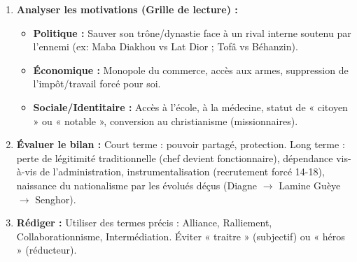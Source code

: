\documentclass[11pt]{article}
\newcommand{\cle}[1]{{\popxbold\color{popdark}#1}}
\begin{document}
\begin{methode}
\begin{enumerate}
\begin{itemize}
        \end{itemize}
    \item \textbf{Analyser les motivations (Grille de lecture) :}
        \begin{itemize}
            \item \textbf{Politique :} Sauver son trône/dynastie face à un rival interne soutenu par l'ennemi (ex: \cle{Maba Diakhou} vs Lat Dior ; \cle{Tofâ} vs Béhanzin).
            \item \textbf{Économique :} Monopole du commerce, accès aux armes, suppression de l'impôt/travail forcé pour soi.
            \item \textbf{Sociale/Identitaire :} Accès à l'école, à la médecine, statut de « citoyen » ou « notable », conversion au christianisme (missionnaires).
        \end{itemize}
    \item \textbf{Évaluer le bilan :} Court terme : pouvoir partagé, protection. Long terme : \cle{perte de légitimité traditionnelle} (chef devient fonctionnaire), \cle{dépendance} vis-à-vis de l'administration, \cle{instrumentalisation} (recrutement forcé 14-18), \cle{naissance du nationalisme} par les évolués déçus (Diagne $\to$ Lamine Guèye $\to$ Senghor).
    \item \textbf{Rédiger :} Utiliser des termes précis : \cle{Alliance}, \cle{Ralliement}, \cle{Collaborationnisme}, \cle{Intermédiation}. Éviter « traitre » (subjectif) ou « héros » (réducteur).
\end{enumerate}
\end{methode}
\end{document}
